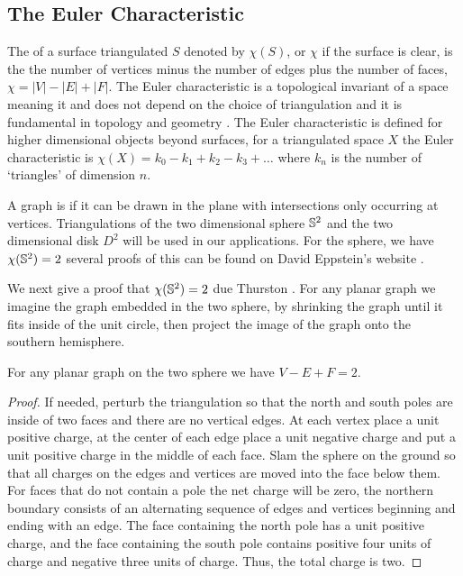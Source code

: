 \subsection{The Euler Characteristic}

The  of a surface triangulated $S$ denoted by $\chi(S)$, or $\chi$
 if the surface is clear,  is the 
the number of vertices minus the number of edges plus  the number of faces, $\chi=|V|-|E|+|F|.$
The Euler characteristic is a topological invariant of a space meaning it
and does not depend on the choice of triangulation and it is fundamental in topology
and geometry \cite{chern_triangles_1979}.
The Euler characteristic is defined for higher dimensional objects beyond surfaces,
 for a triangulated space $X$ the Euler characteristic is 
$\chi(X)=k_0-k_1+k_2-k_3+\ldots$ where $k_n$ is the number of `triangles' of dimension $n.$



A  graph  is  if it can be drawn in the plane with intersections only occurring
at vertices.
Triangulations of the two dimensional sphere $\mathbb{S}^2$ and the two dimensional disk $D^2$ 
will be used in our applications.
For the sphere, we have $\chi(\mathbb{S}^2)=2$ 
several proofs of this can be found on David Eppstein's website \cite{eppstein-proofs}.




We next give a proof that $\chi(\mathbb{S}^2)=2$ due Thurston \cite{thurston}. 
For any planar graph we imagine the graph embedded in the two sphere, by
shrinking the graph until it fits inside of the unit circle, then project the image of the graph
onto the southern hemisphere.  

\begin{theorem}\label{thm:euler}
For any planar graph on the two sphere we have $V-E+F=2.$
\end{theorem}

\begin{proof}
If needed, perturb the triangulation so that the north and south poles are 
inside of  two faces and there are no vertical edges. At each vertex place a unit positive
charge, at the center of each edge place a unit negative charge and put a unit positive
charge in the middle of each face. Slam the sphere on the ground so that all charges
on the edges and vertices are moved into the face below them. For faces that do not contain a pole
the net charge will be zero, the northern boundary consists of an alternating sequence
of edges and vertices  beginning  and ending with an edge.
The face containing the north pole has a unit positive charge, and the face containing the south
pole contains positive four units of charge and negative three units of charge.
Thus, the total charge is two.

\end{proof}

